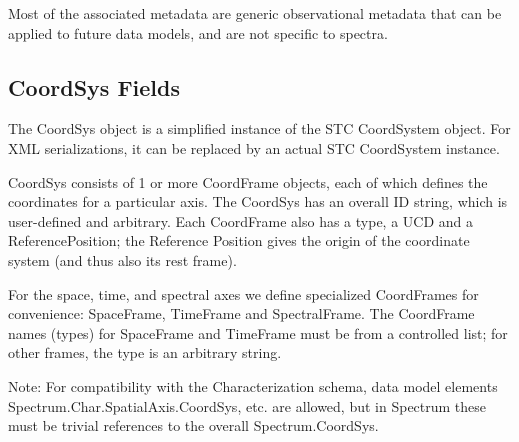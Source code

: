 \documentclass[11pt]{article}
\begin{document}
Most of the associated metadata are generic observational
metadata that can be applied to future data models, and are
not specific to spectra.

\subsection{CoordSys Fields}

The CoordSys object is a simplified instance of the STC CoordSystem object.
For XML serializations, it can be replaced by an actual STC CoordSystem
instance.

  CoordSys consists of 1 or more CoordFrame objects, each of which defines
the coordinates for a particular axis. The CoordSys has an overall ID string,
which is user-defined and arbitrary. 
Each CoordFrame also has a type, a UCD and a ReferencePosition; the Reference
Position gives the origin of the coordinate system (and thus also its rest frame).

For the space, time, and spectral axes we define specialized CoordFrames
for convenience: SpaceFrame, TimeFrame and SpectralFrame. The
CoordFrame names (types) for SpaceFrame and TimeFrame must be from a
controlled list; for other frames, the type is an arbitrary string.

Note: For compatibility with the Characterization schema, data model
elements Spectrum.Char.SpatialAxis.CoordSys, etc. are allowed, but
in Spectrum these must be trivial references to the overall
Spectrum.CoordSys.


\setcounter{table}{3}
\end{document}
